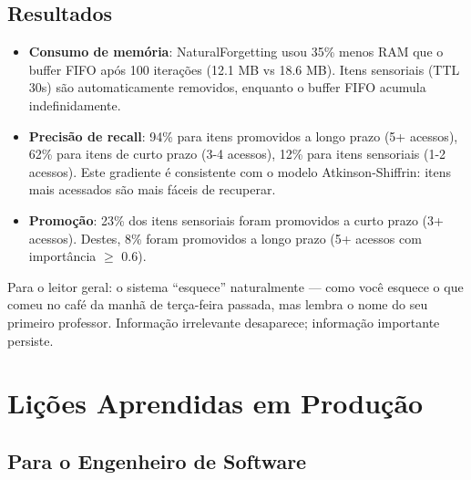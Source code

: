 \subsection{Resultados}

\begin{itemize}
    \item \textbf{Consumo de memória}: NaturalForgetting usou 35\% menos RAM que o buffer FIFO após 100 iterações (12.1 MB vs 18.6 MB). Itens sensoriais (TTL 30s) são automaticamente removidos, enquanto o buffer FIFO acumula indefinidamente.
    \item \textbf{Precisão de recall}: 94\% para itens promovidos a longo prazo (5+ acessos), 62\% para itens de curto prazo (3-4 acessos), 12\% para itens sensoriais (1-2 acessos). Este gradiente é consistente com o modelo Atkinson-Shiffrin: itens mais acessados são mais fáceis de recuperar.
    \item \textbf{Promoção}: 23\% dos itens sensoriais foram promovidos a curto prazo (3+ acessos). Destes, 8\% foram promovidos a longo prazo (5+ acessos com importância $\geq$ 0.6).
\end{itemize}

Para o leitor geral: o sistema ``esquece'' naturalmente — como você esquece o que comeu no café da manhã de terça-feira passada, mas lembra o nome do seu primeiro professor. Informação irrelevante desaparece; informação importante persiste.

\section{Lições Aprendidas em Produção}

\subsection{Para o Engenheiro de Software} 

